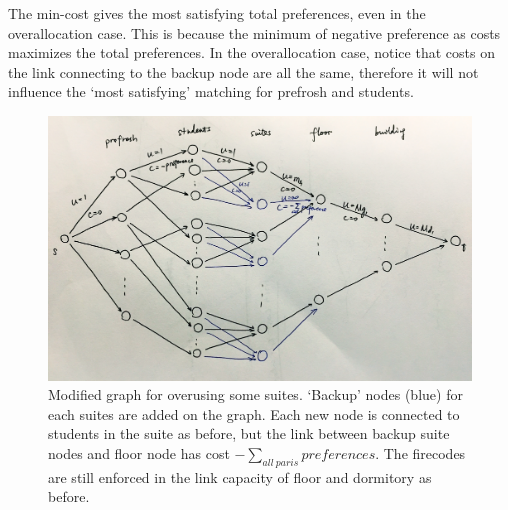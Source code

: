 \documentclass[12pt]{article}
\begin{document}
The min-cost gives the most satisfying total preferences, even in the overallocation case. This is because the minimum of negative preference as costs maximizes the total preferences. In the overallocation case, notice that costs on the link connecting to the backup node are all the same, therefore it will not influence the `most satisfying' matching for prefrosh and students. 
\begin{figure}[h!]
	\centering
	\includegraphics[width=1\textwidth]{5-b.jpg}
	\caption{Modified graph for overusing some suites. `Backup' nodes (blue) for each suites are added on the graph. Each new node is connected to students in the suite as before, but the link between backup suite nodes and floor node has cost $-\sum_{all\:paris}preferences$. The firecodes are still enforced in the link capacity of floor and dormitory as before.}
	\label{fig:5-b}
\end{figure}
\end{document}
